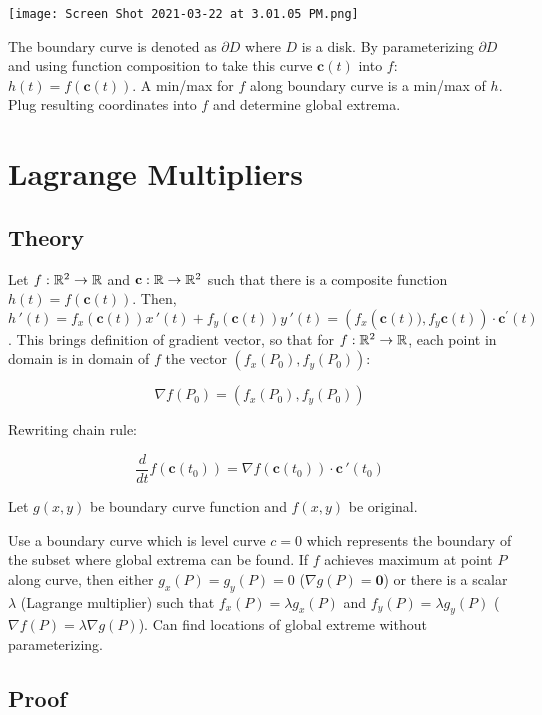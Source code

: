\begin{center}
    \texttt{[image: Screen Shot 2021-03-22 at 3.01.05 PM.png]}
\end{center}

The boundary curve is denoted as $\partial D$ where $D$ is a disk. By parameterizing $\partial D$ and using function
composition to take this curve $\textbf{c}(t)$ into $f$: $h(t)=f(\textbf{c}(t))$. A min/max for $f$ along boundary curve
is a min/max of $h$. Plug resulting coordinates into $f$ and determine global extrema.

\section{Lagrange Multipliers}

\subsection{Theory}

Let $f:\mathbb{R}^2\rightarrow \mathbb{R}$ and $\textbf{c}:\mathbb{R}\rightarrow \mathbb{R}^2$ such that there is a composite function $h(t)=f(\textbf{c}(t))$.
Then, $h\,'(t)=f_x(\textbf{c}(t))x\,'(t)+f_y(\textbf{c}(t))y\,'(t)=\left(f_{x}\left(\textbf{c}(t)), f_{y} \textbf{c}(t)\right) \cdot \textbf{c}^{\prime}(t)\right.$.
This brings definition of gradient vector, so that for $f:\mathbb{R}^2\rightarrow \mathbb{R}$, each point in domain is in domain of $f$ the vector $\left(f_{x}\left(P_{0}\right), f_{y}\left(P_{0}\right)\right)$:

\[\nabla f\left(P_{0}\right)=\left(f_{x}\left(P_{0}\right), f_{y}\left(P_{0}\right)\right)\]

Rewriting chain rule:

\[\frac{d}{dt}f(\textbf{c}(t_0))=\nabla f(\textbf{c}(t_0))\cdot \textbf{c}\,'(t_0)\]

Let $g(x,y)$ be boundary curve function and $f(x,y)$ be original.

Use a boundary curve which is level curve $c=0$ which represents the boundary of the subset where global extrema can be found. 
If $f$ achieves maximum at point $P$ along curve, then either $g_x(P)=g_y(P)=0$ ($\nabla g(P)=\textbf{0}$) or there is a scalar $\lambda$ (Lagrange multiplier)
such that $f_x(P)=\lambda g_x(P)$ and $f_y(P)=\lambda g_y(P)$ ($\nabla f(P)=\lambda \nabla g(P)$). Can find locations of global extreme without parameterizing.

\subsection{Proof}

